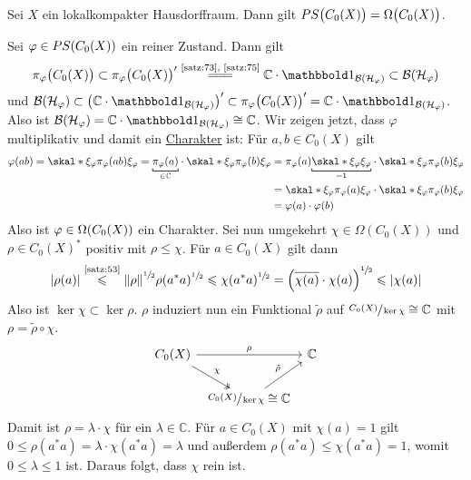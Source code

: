 \begin{satz}[{name=[{Reine Zustände von $C_0(X)$}]}]
	Sei $X$ ein lokalkompakter Hausdorffraum.
	Dann gilt $PS\enbrace[\big]{C_0(X)}=\Omega \enbrace[\big]{C_0(X)}$.
\end{satz}
\begin{beweis}
	Sei $\varphi \in PS \enbrace*{C_0(X)}$ ein reiner Zustand.
	Dann gilt
	\[
		\pi_\varphi \enbrace[\big]{C_0(X)} \subset \pi_\varphi \enbrace[\big]{C_0(X)}' \StackText{\ref{satz:73}, \ref{satz:75}}{=\joinrel=\joinrel=} \mathbb{C} \cdot \ind_{\mathcal{B}(\mathcal{H}_\varphi)} \subset \mathcal{B}(\mathcal{H}_\varphi)
	\]
	und $\mathcal{B}(\mathcal{H}_\varphi) \subset \enbrace*{\mathbb{C}\cdot \ind_{\mathcal{B}(\mathcal{H}_\varphi)}}' \subset \pi_\varphi \enbrace[\big]{C_0(X)}'=\mathbb{C}\cdot \ind_{\mathcal{B}(\mathcal{H}_\varphi)}$.
	Also ist $\mathcal{B}(\mathcal{H}_\varphi)= \mathbb{C} \cdot \ind_{\mathcal{B}(\mathcal{H}_\varphi)} \cong \mathbb{C}$.
	Wir zeigen jetzt, dass $\varphi$ multiplikativ und damit ein \hyperref[def:charakter]{Charakter} ist:
	Für $a,b \in C_0(X)$ gilt 
	\begin{align}
		\varphi(ab) = \skal*{\xi_\varphi}{\pi_\varphi(ab)\xi_\varphi} = \Underbracket{\pi_\varphi(a)}{\in \mathbb{C}}\cdot  \skal*{\xi_\varphi}{\pi_\varphi(b) \xi_\varphi} 
		&= \pi_\varphi(a) \Underbracket{\skal*{\xi_\varphi}{\xi_\varphi}}{=1} \cdot \skal*{\xi_\varphi}{\pi_\varphi(b)\xi_\varphi} \\
		&= \skal*{\xi_\varphi}{\pi_\varphi(a)\xi_\varphi} \cdot \skal*{\xi_\varphi}{\pi_\varphi(b)\xi_\varphi} \\
		&= \varphi(a) \cdot \varphi(b)
	\end{align}
	Also ist $\varphi \in \Omega \enbrace*{C_0(X)}$ ein Charakter. 
	Sei nun umgekehrt $\chi \in \Omega(C_0(X))$ und $\rho \in C_0(X)^*$ positiv mit $\rho \le \chi$.
	Für $a \in C_0(X)$ gilt dann
	\[
		\abs*{\rho(a)} \StackText{\ref{satz:53}}{\le} \norm*{\rho}^{\sfrac{1}{2}} \rho(a^*a)^{\sfrac{1}{2}} \le \chi(a^* a)^{\sfrac{1}{2}}= \enbrace*{\overline{\chi(a)}\cdot  \chi(a)}^{\sfrac{1}{2}} \le \abs*{\chi(a)} 
	\]
	Also ist $\ker \chi \subset \ker \rho$.
	$\rho$ induziert nun ein Funktional $\tilde{\rho}$ auf $\sfrac{C_0(X)}{\ker \chi} \cong \mathbb{C}$ mit $\rho = \tilde{\rho} \circ \chi$.
	\[
		\begin{tikzcd}[column sep=.5em]
			C_0(X) \ar[rr,"\rho"] \drar["\chi",two heads]& & \mathbb{C} \\
			& \sfrac{C_0(X)}{\ker \chi} \cong \mathbb{C} \urar["\tilde{\rho}"]
		\end{tikzcd}
	\]
	Damit ist $\rho = \lambda \cdot \chi$ für ein $\lambda \in \mathbb{C}$.
	Für $a \in C_0(X)$ mit $\chi(a)=1$ gilt $0\le\rho(a^*a)= \lambda \cdot \chi(a^*a)=\lambda$ und außerdem $\rho(a^*a) \le \chi(a^*a)=1$, womit $0 \le \lambda\le 1$ ist.
	Daraus folgt, dass $\chi$ rein ist.
\end{beweis}

